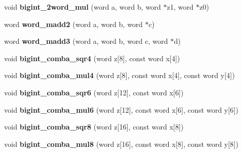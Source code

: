 \begin{DoxyCompactItemize}
\item 
\hypertarget{namespaceBotan_a3c96c3a7610aa3bc7c8ccb368298c7b4}{void {\bfseries bigint\-\_\-2word\-\_\-mul} (word a, word b, word $\ast$z1, word $\ast$z0)}\label{namespaceBotan_a3c96c3a7610aa3bc7c8ccb368298c7b4}

\item 
\hypertarget{namespaceBotan_aa514bc78b9f0d9357573283e43efda66}{word {\bfseries word\-\_\-madd2} (word a, word b, word $\ast$c)}\label{namespaceBotan_aa514bc78b9f0d9357573283e43efda66}

\item 
\hypertarget{namespaceBotan_a7619806b10d1b3e4f18da3a48f11138b}{word {\bfseries word\-\_\-madd3} (word a, word b, word c, word $\ast$d)}\label{namespaceBotan_a7619806b10d1b3e4f18da3a48f11138b}

\item 
\hypertarget{namespaceBotan_a6860ccbbfd8836827cd5bf6c3bfae807}{void {\bfseries bigint\-\_\-comba\-\_\-sqr4} (word z\mbox{[}8\mbox{]}, const word x\mbox{[}4\mbox{]})}\label{namespaceBotan_a6860ccbbfd8836827cd5bf6c3bfae807}

\item 
\hypertarget{namespaceBotan_a1fd2af85783a80acdb744dd0a13c346d}{void {\bfseries bigint\-\_\-comba\-\_\-mul4} (word z\mbox{[}8\mbox{]}, const word x\mbox{[}4\mbox{]}, const word y\mbox{[}4\mbox{]})}\label{namespaceBotan_a1fd2af85783a80acdb744dd0a13c346d}

\item 
\hypertarget{namespaceBotan_a2c556b6e52529aee71f16bdd2d8e10c0}{void {\bfseries bigint\-\_\-comba\-\_\-sqr6} (word z\mbox{[}12\mbox{]}, const word x\mbox{[}6\mbox{]})}\label{namespaceBotan_a2c556b6e52529aee71f16bdd2d8e10c0}

\item 
\hypertarget{namespaceBotan_ae228fc8d81499547ab6d629b0864f54f}{void {\bfseries bigint\-\_\-comba\-\_\-mul6} (word z\mbox{[}12\mbox{]}, const word x\mbox{[}6\mbox{]}, const word y\mbox{[}6\mbox{]})}\label{namespaceBotan_ae228fc8d81499547ab6d629b0864f54f}

\item 
\hypertarget{namespaceBotan_aee1eb8900e753075962ec4a8ea38536f}{void {\bfseries bigint\-\_\-comba\-\_\-sqr8} (word z\mbox{[}16\mbox{]}, const word x\mbox{[}8\mbox{]})}\label{namespaceBotan_aee1eb8900e753075962ec4a8ea38536f}

\item 
\hypertarget{namespaceBotan_a59661689c552486b99c1e7a56e610835}{void {\bfseries bigint\-\_\-comba\-\_\-mul8} (word z\mbox{[}16\mbox{]}, const word x\mbox{[}8\mbox{]}, const word y\mbox{[}8\mbox{]})}\label{namespaceBotan_a59661689c552486b99c1e7a56e610835}


\end{DoxyCompactItemize}
